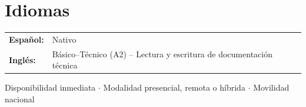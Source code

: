 \documentclass[10pt, letterpaper]{article}
\begin{document}
\section{Idiomas}

\noindent
\begin{tabularx}{\linewidth}{@{}l X@{}}
  \textbf{Español:} & Nativo \\
  \textbf{Inglés:} & Básico–Técnico (A2) – Lectura y escritura de documentación técnica \\
\end{tabularx}

\vspace{8pt}
\begin{center}
\textcolor{medgray}{\small Disponibilidad inmediata $\cdot$ Modalidad presencial, remota o híbrida $\cdot$ Movilidad nacional}
\end{center}
\end{document}
